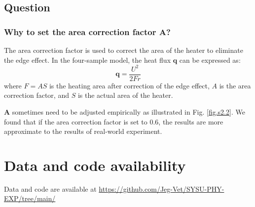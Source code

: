 \documentclass[12pt,a4paper,UTF8]{article}
\begin{document}
    \subsection{Question}
        \subsubsection{Why to set the area correction factor $\boldsymbol{A}$?}
        The area correction factor is used to correct the area of the heater to eliminate the edge effect. 
        In the four-sample model, the heat flux $\boldsymbol{q}$ can be expressed as:
        \begin{equation}
            \boldsymbol{q} = \frac{U^2}{2Fr}
        \end{equation}
        where $F=AS$ is the heating area after correction of the edge effect, $A$ is the area correction factor, 
        and $S$ is the actual area of the heater.

        $\boldsymbol{A}$ sometimes need to be adjusted empirically as illustrated in Fig. \ref{fig.s2.2}. 
        We found that if the area correction factor is set to 0.6, the results are more approximate to the results of real-world experiment.



\section{Data and code availability}
Data and code are available at \url{https://github.com/Jeg-Vet/SYSU-PHY-EXP/tree/main/}
\end{document}
